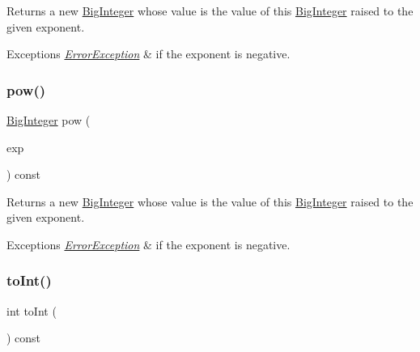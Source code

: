 Returns a new \mbox{\hyperlink{classBigInteger}{Big\+Integer}} whose value is the value of this \mbox{\hyperlink{classBigInteger}{Big\+Integer}} raised to the given exponent. 


\begin{DoxyExceptions}{Exceptions}
{\em \mbox{\hyperlink{classErrorException}{Error\+Exception}}} & if the exponent is negative. \\
\hline
\end{DoxyExceptions}
\mbox{\label{classBigInteger_af004e9189931255ce5d71f55d4ab4976}} 
\subsubsection{\texorpdfstring{pow()}{pow()}\hspace{0.1cm}{\footnotesize\ttfamily [2/2]}}
{\footnotesize\ttfamily \mbox{\hyperlink{classBigInteger}{Big\+Integer}} pow (\begin{DoxyParamCaption}\item[{const \mbox{\hyperlink{classBigInteger}{Big\+Integer}} \&}]{exp }\end{DoxyParamCaption}) const}



Returns a new \mbox{\hyperlink{classBigInteger}{Big\+Integer}} whose value is the value of this \mbox{\hyperlink{classBigInteger}{Big\+Integer}} raised to the given exponent. 


\begin{DoxyExceptions}{Exceptions}
{\em \mbox{\hyperlink{classErrorException}{Error\+Exception}}} & if the exponent is negative. \\
\hline
\end{DoxyExceptions}
\mbox{\label{classBigInteger_a8cc7782de081ce702a9be163b4cb8f84}} 
\subsubsection{\texorpdfstring{to\+Int()}{toInt()}}
{\footnotesize\ttfamily int to\+Int (\begin{DoxyParamCaption}{ }\end{DoxyParamCaption}) const}



